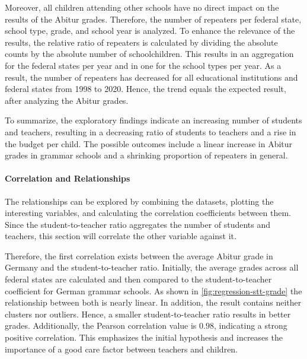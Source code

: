 Moreover, all children attending other schools have no direct impact on the results of the Abitur grades. Therefore, the number of repeaters per federal state, school type, grade, and school year is analyzed. To enhance the relevance of the results, the relative ratio of repeaters is calculated by dividing the absolute counts by the absolute number of schoolchildren. This results in an aggregation for the federal states per year and in one for the school types per year. As a result, the number of repeaters has decreased for all educational institutions and federal states from 1998 to 2020. Hence, the trend equals the expected result, after analyzing the Abitur grades.

To summarize, the exploratory findings indicate an increasing number of students and teachers, resulting in a decreasing ratio of students to teachers and a rise in the budget per child. The possible outcomes include a linear increase in Abitur grades in grammar schools and a shrinking proportion of repeaters in general.

\paragraph{Correlation and Relationships}
The relationships can be explored by combining the datasets, plotting the interesting variables, and calculating the correlation coefficients between them. Since the student-to-teacher ratio aggregates the number of students and teachers, this section will correlate the other variable against it.

Therefore, the first  correlation exists between the average Abitur grade in Germany and the student-to-teacher ratio. Initially, the average grades across all federal states are calculated and then compared to the student-to-teacher coefficient for German grammar schools. As shown in \autoref{fig:regression-stt-grade} the relationship between both is nearly linear. In addition, the result contains neither clusters nor outliers. Hence, a smaller student-to-teacher ratio results in better grades. Additionally, the Pearson correlation value is $0.98$, indicating a strong positive correlation. This emphasizes the initial hypothesis and increases the importance of a good care factor between teachers and children.

